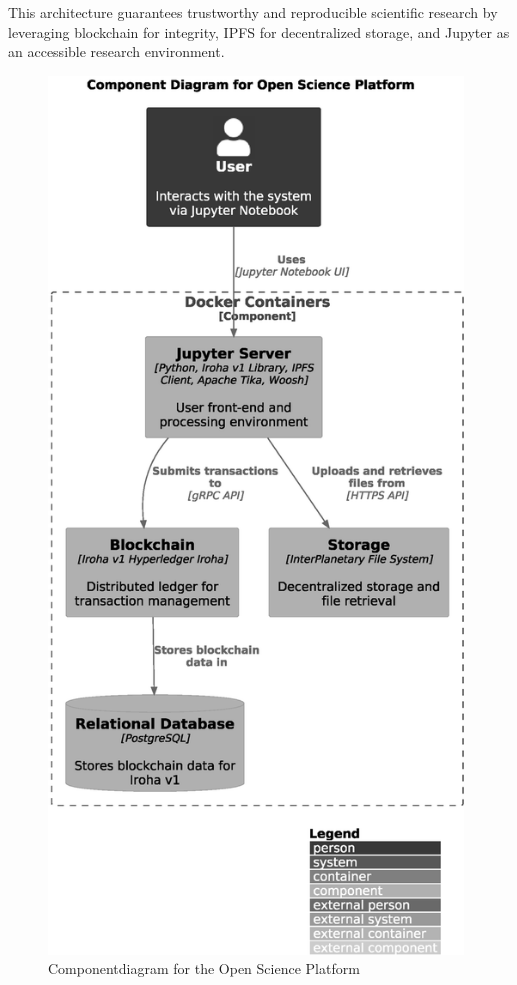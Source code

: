 \documentclass{article}
\begin{document}
This architecture guarantees trustworthy and reproducible scientific research by leveraging blockchain for integrity, IPFS for decentralized storage, and Jupyter as an accessible research environment.


\begin{figure}[htbp]
      \centering
      \includegraphics[width=0.98\textwidth, keepaspectratio]{c4_component_diagram.eps}
      \caption{Componentdiagram for the Open Science Platform}
      \label{fig:c4_component_diagram}
\end{figure}
\end{document}
